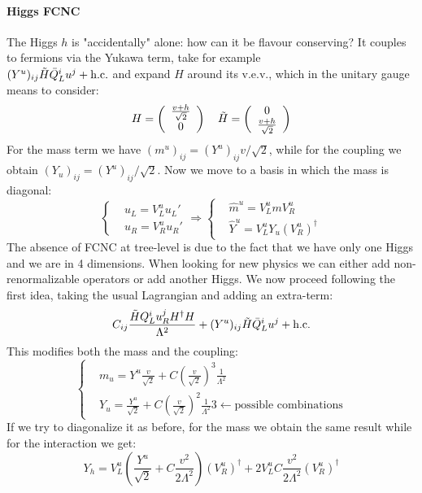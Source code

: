 \documentclass[../main.tex]{subfiles}
\begin{document}
\paragraph{Higgs FCNC} The Higgs $h$ is "accidentally" alone: how can it be flavour conserving? It couples to fermions via the Yukawa term, take for example\\ $(Y^u)_{ij}\Tilde{H}\bar{Q}_L^iu^j+\text{h.c.}$ and expand $H$ around its v.e.v., which in the unitary gauge means to consider:
\[
H=\left(\begin{array}{c}
    \frac{v+h}{\sqrt{2}} \\
    0
\end{array}\right)
\quad
\Tilde{H}=\left(\begin{array}{c}
    0\\
    \frac{v+h}{\sqrt{2}}
\end{array}\right)
\]
For the mass term we have $(m^u)_{ij}=(Y^u)_{ij}v/\sqrt{2}$, while for the coupling we obtain $(Y_u)_{ij}=(Y^u)_{ij}/\sqrt{2}$. Now we move to a basis in which the mass is diagonal:
\[
\left\{
\begin{aligned}
&u_L=V_L^uu_L'\\
&u_R=V_R^uu_R'
\end{aligned}
\right.
\Rightarrow
\left\{
\begin{aligned}
&\hat{m}^u=V_L^umV_R^u\\
&\hat{Y}^u=V_L^uY_u(V_R^u)^\dagger
\end{aligned}
\right.
\]
The absence of FCNC at tree-level is due to the fact that we have only one Higgs and we are in 4 dimensions. When looking for new physics we can either add non-renormalizable operators or add another Higgs. We now proceed following the first idea, taking the usual Lagrangian and adding an extra-term:
\[
C_{ij}\frac{\Tilde{H}Q_L^iu_R^jH^\dagger H}{\Lambda^2}+(Y^u)_{ij}\Tilde{H}\bar{Q}_L^iu^j+\text{h.c.}
\]
This modifies both the mass and the coupling:
\[
\left\{
\begin{aligned}
&m_u=Y^u\frac{v}{\sqrt{2}}+C\left(\frac{v}{\sqrt{2}}\right)^3\frac{1}{\Lambda^2}\\
&Y_u=\frac{Y^u}{\sqrt{2}}+C\left(\frac{v}{\sqrt{2}}\right)^2\frac{1}{\Lambda^2}3\xleftarrow[]{}\text{possible combinations}
\end{aligned}
\right.
\]
If we try to diagonalize it as before, for the mass we obtain the same result while for the interaction we get:
\[
Y_h=V_L^u\left(\frac{Y^u}{\sqrt{2}}+C\frac{v^2}{2\Lambda^2}\right)(V_R^u)^\dagger+2V_L^uC\frac{v^2}{2\Lambda^2}(V_R^u)^\dagger
\]
\end{document}
